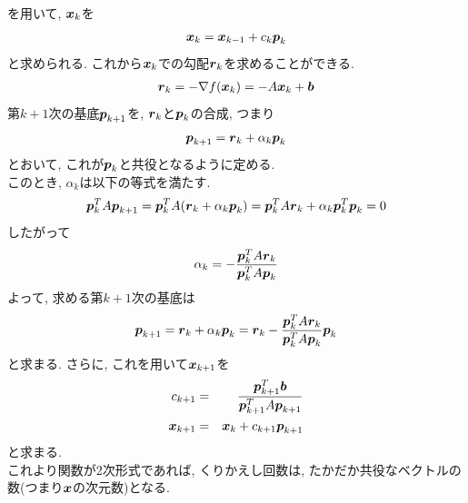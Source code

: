 \documentclass[dvipdfmx,a4j]{jsarticle}
\begin{document}
       を用いて, $\mbox{\boldmath $x$}_{k}$を
       \begin{eqnarray*}
         \mbox{\boldmath $x$}_{k}=\mbox{\boldmath $x$}_{k-1}+c_{k}\mbox{\boldmath $p$}_{k}
       \end{eqnarray*}
       と求められる. これから$\mbox{\boldmath $x$}_{k}$での勾配$\mbox{\boldmath $r$}_{k}$を求めることができる.
       \begin{eqnarray*}
         \mbox{\boldmath $r$}_{k}=-\nabla f(\mbox{\boldmath $x$}_{k})=-A\mbox{\boldmath $x$}_{k}+\mbox{\boldmath $b$}
       \end{eqnarray*}
       第$k+1$次の基底$\mbox{\boldmath $p$}_{k+1}$を, $\mbox{\boldmath $r$}_{k}$と$\mbox{\boldmath $p$}_{k}$の合成, つまり
       \begin{eqnarray*}
         \mbox{\boldmath $p$}_{k+1}=\mbox{\boldmath $r$}_{k}+\alpha_{k}\mbox{\boldmath $p$}_{k}
       \end{eqnarray*}
       とおいて, これが$\mbox{\boldmath $p$}_{k}$と共役となるように定める.\\
       このとき, $\alpha_{k}$は以下の等式を満たす.
       \begin{eqnarray*}
         \mbox{\boldmath $p$}_{k}^{T}A\mbox{\boldmath $p$}_{k+1}=\mbox{\boldmath $p$}_{k}^{T}A(\mbox{\boldmath $r$}_{k}+\alpha_{k}\mbox{\boldmath $p$}_{k})=\mbox{\boldmath $p$}_{k}^{T}A\mbox{\boldmath $r$}_{k}+\alpha_{k}\mbox{\boldmath $p$}_{k}^{T}\mbox{\boldmath $p$}_{k}=0 
       \end{eqnarray*}
       したがって
       \begin{eqnarray*}
         \alpha_{k}=-\frac{\mbox{\boldmath $p$}_{k}^{T}A\mbox{\boldmath $r$}_{k}}{\mbox{\boldmath $p$}_{k}^{T}A\mbox{\boldmath $p$}_{k}}
       \end{eqnarray*}
       よって, 求める第$k+1$次の基底は
       \begin{eqnarray*}
         \mbox{\boldmath $p$}_{k+1}=\mbox{\boldmath $r$}_{k}+\alpha_{k}\mbox{\boldmath $p$}_{k}=\mbox{\boldmath $r$}_{k}-\frac{\mbox{\boldmath $p$}_{k}^{T}A\mbox{\boldmath $r$}_{k}}{\mbox{\boldmath $p$}_{k}^{T}A\mbox{\boldmath $p$}_{k}}\mbox{\boldmath $p$}_{k} 
       \end{eqnarray*}
       と求まる. さらに, これを用いて$\mbox{\boldmath $x$}_{k+1}$を
       \begin{eqnarray*}
         c_{k+1}&=&\frac{\mbox{\boldmath $p$}_{k+1}^{T}\mbox{\boldmath $b$}}{\mbox{\boldmath $p$}_{k+1}^{T}A\mbox{\boldmath $p$}_{k+1}}\\
         \mbox{\boldmath $x$}_{k+1}&=&\mbox{\boldmath $x$}_{k}+c_{k+1}\mbox{\boldmath $p$}_{k+1}
       \end{eqnarray*}
       と求まる.\\
       これより関数が2次形式であれば, くりかえし回数は, たかだか共役なベクトルの数(つまり$\mbox{\boldmath $x$}$の次元数)となる.
\end{document}
